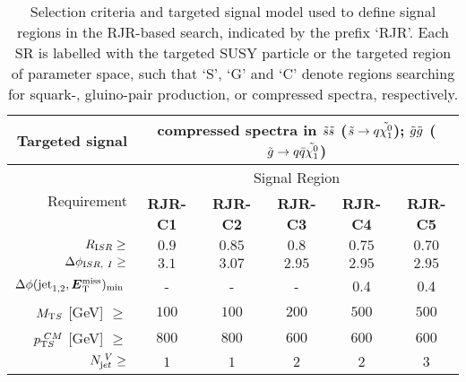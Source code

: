 {\begin{table}[H]
\begin{tabular}{|r|c|c|c|c|c|}
\hline
       Targeted signal & \multicolumn{5}{c|}{ compressed spectra in $\tilde{s}\tilde{s}$ ($\tilde{s} \rightarrow q \tilde{\chi^0_1}$); $\tilde{g}\tilde{g}$ ($\tilde{g} \rightarrow q\bar{q} \tilde{\chi^0_1}$) } \\
       \hline \hline
      \multirow{2}{*}{Requirement}                                             & \multicolumn{5}{c|}{Signal Region}                                                           \\
 \cline{2-6}                                                                   & \textbf{ RJR-C1} & \textbf{ RJR-C2} & \textbf{ RJR-C3} & \textbf{ RJR-C4} & \textbf{ RJR-C5} \\
\hline
$R_{\textrm ISR} \geq $                                                        & $ 0.9$           & $ 0.85$          & $ 0.8$           & $ 0.75$          & $ 0.70$          \\ \hline
$ \Delta\phi_{\textrm ISR,~I} \geq$                                            & $ 3.1$           & $ 3.07$          & $ 2.95$          & $ 2.95$          & $ 2.95$          \\ \hline
$\Delta\phi(\textrm{jet}_{\textrm 1,2},\bm{E}\mathrm{^{miss}_T})_{\text{min}} \> $ & -                & -                & -                & 0.4              & 0.4              \\ \hline
$M_{\textrm T S}$ [GeV] $\geq$                                                 & $ 100$           & $ 100$           & $ 200$           & $ 500$           & $ 500$           \\ \hline
$p_{\textrm T S}^{\textrm ~CM}$ [GeV]  $\ge$                                   & $ 800$           & $ 800$           & $ 600$           & $ 600$           & $ 600$           \\ \hline
$N_{\textrm jet}^{\textrm ~V} \geq$                                            & $ 1$             & $ 1$             & $ 2$             & $ 2$             & $ 3$             \\
\hline

\end{tabular}

\caption{Selection criteria and targeted signal model used to define signal regions in the RJR-based search, indicated by the prefix `RJR'.
Each SR is labelled with the targeted SUSY particle or the targeted region of parameter space, such that `S', `G' and `C' denote regions searching for squark-, gluino-pair production, or compressed spectra, respectively.
\label{tab:RJsrdefs}}
\end{table}
}

